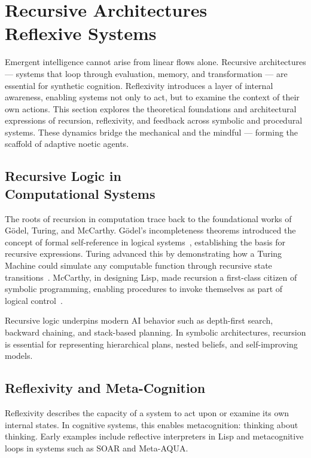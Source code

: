 \documentclass[twocolumn,10pt]{article}
\begin{document}
\section{Recursive Architectures\\
Reflexive Systems}

Emergent intelligence cannot arise from linear flows alone. Recursive architectures — systems that loop through evaluation, memory, and transformation — are essential for synthetic cognition. Reflexivity introduces a layer of internal awareness, enabling systems not only to act, but to examine the context of their own actions. This section explores the theoretical foundations and architectural expressions of recursion, reflexivity, and feedback across symbolic and procedural systems. These dynamics bridge the mechanical and the mindful — forming the scaffold of adaptive noetic agents.

\subsection{Recursive Logic in\\
Computational Systems}

The roots of recursion in computation trace back to the foundational works of Gödel, Turing, and McCarthy. Gödel's incompleteness theorems introduced the concept of formal self-reference in logical systems~\cite{godel1931}, establishing the basis for recursive expressions. Turing advanced this by demonstrating how a Turing Machine could simulate any computable function through recursive state transitions~\cite{turing1936}. McCarthy, in designing Lisp, made recursion a first-class citizen of symbolic programming, enabling procedures to invoke themselves as part of logical control~\cite{mccarthy1960}.

Recursive logic underpins modern AI behavior such as depth-first search, backward chaining, and stack-based planning. In symbolic architectures, recursion is essential for representing hierarchical plans, nested beliefs, and self-improving models.

\subsection{Reflexivity and Meta-Cognition}

Reflexivity describes the capacity of a system to act upon or examine its own internal states. In cognitive systems, this enables metacognition: thinking about thinking. Early examples include reflective interpreters in Lisp and metacognitive loops in systems such as SOAR and Meta-AQUA.
\end{document}
